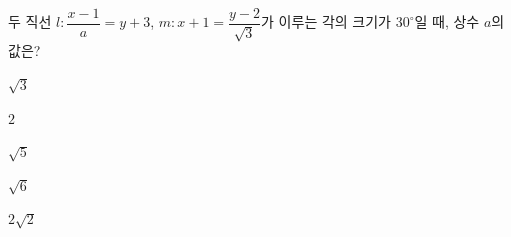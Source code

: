 두 직선 $l\colon \dfrac{x-1}{a}=y+3$, $m\colon x+1=\dfrac{y-2}{\sqrt{3}}$가 이루는 각의 크기가 $30^\circ$일 때, 상수 $a$의 값은? 
\begin{choices32}{\rule[-3ex]{0pt}{8ex}$\sqrt{3}$}{\rule[-3ex]{0pt}{8ex}$2$}{\rule[-3ex]{0pt}{8ex}$\sqrt{5}$}{\rule[-3ex]{0pt}{8ex}$\sqrt{6}$}{\rule[-3ex]{0pt}{8ex}$2\sqrt{2}$}\end{choices32}
